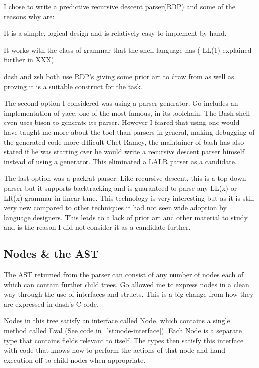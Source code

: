 I chose to write a predictive recursive descent parser(RDP) and some of the reasons why are:
\begin{enumerate*}
	\item It is a simple, logical design and is relatively easy to implement by hand.
    \item It works with the class of grammar that the shell language has (
    LL(1) explained further in XXX)
    \item dash and zsh both use RDP's giving some prior art to draw from as well as proving it is a suitable construct for the task.
\end{enumerate*}

The second option I considered was using a parser generator.
Go includes an implementation of yacc, one of the most famous, in its toolchain.
The Bash shell even uses bison to generate its parser.
However I feared that using one would have taught me more about the tool than parsers in general, making debugging of the generated code more difficult 
Chet Ramey, the maintainer of bash has also stated if he was starting over he would write a recursive descent parser himself\cite{BASH-ARCH} instead of using a generator.
This eliminated a LALR parser as a candidate.

The last option was a packrat parser.
Like recursive descent, this is a top down parser but it supports backtracking and is guaranteed to parse any LL(x) or LR(x) grammar in linear time.
This technology is very interesting but as it is still very new compared to other techniques it had not seen wide adoption by language designers.
This leads to a lack of prior art and other material to study and is the reason I did not consider it as a candidate further.

\subsection{Nodes \& the AST}
The AST returned from the parser can consist of any number of nodes each of which can contain further child trees.
Go allowed me to express nodes in a clean way through the use of interfaces and structs.
This is a big change from how they are expressed in dash's C code.

Nodes in this tree satisfy an interface called Node, which contains a single method called Eval (See code in~\autoref{lst:node-interface}).
Each Node is a separate type that contains fields relevant to itself.
The types then satisfy this interface with code that knows how to perform the actions of that node and hand execution off to child nodes when appropriate.


